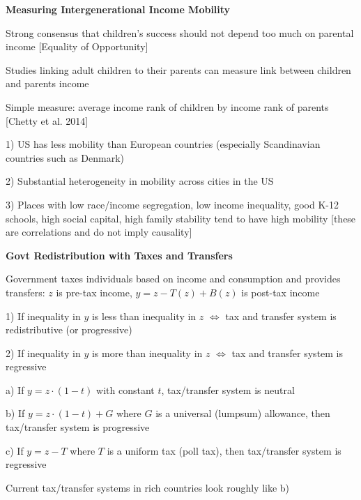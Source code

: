 \documentclass[landscape]{slides}
\begin{document}
\begin{slide}
\begin{center}
{\bf Measuring Intergenerational Income Mobility}
\end{center}
Strong consensus that children's success should not depend too much on parental income [Equality of Opportunity]

Studies linking adult children to their parents can measure link between children and parents income

Simple measure: average income rank of children by income rank of parents [Chetty et al. 2014]

1) US has less mobility than European countries (especially Scandinavian countries such as Denmark)

2) Substantial heterogeneity in mobility across cities in the US

3) Places with low race/income segregation, low income inequality, good K-12 schools, high social capital, high family stability tend to have high mobility [these are correlations and do not imply causality]

\end{slide}

\begin{slide}

\end{slide}


\begin{slide}
\begin{center}
{\bf Govt Redistribution with Taxes and Transfers}
\end{center}

Government taxes individuals based on income and consumption and
provides transfers: $z$ is pre-tax income, $y=z-T(z)+B(z)$ is
post-tax income

1) If inequality in $y$ is less than inequality in $z$
$\Leftrightarrow$ tax and transfer system is redistributive (or
progressive)

2) If inequality in $y$ is more than inequality in $z$
$\Leftrightarrow$ tax and transfer system is regressive

\small
a) If $y=z \cdot (1-t)$ with constant $t$, tax/transfer system is
neutral

b) If $y=z \cdot (1-t)+G$ where $G$ is a universal (lumpsum)
allowance, then tax/transfer system is progressive 

c) If $y=z-T$ where $T$ is a uniform tax (poll tax), then
tax/transfer system is regressive

Current tax/transfer systems in rich countries look roughly like b) 
\end{slide}
\end{document}

